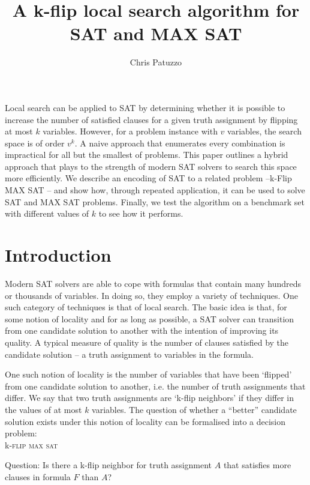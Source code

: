 \documentclass{article}
\begin{document}
\title{A k-flip local search algorithm for SAT and MAX SAT}
\author{Chris Patuzzo}
\maketitle

\abstract
Local search can be applied to SAT by determining whether it is possible to
increase the number of satisfied clauses for a given truth assignment by
flipping at most $k$ variables. However, for a problem instance with $v$
variables, the search space is of order $v^k$. A naive approach that enumerates
every combination is impractical for all but the smallest of problems. This
paper outlines a hybrid approach that plays to the strength of modern SAT
solvers to search this space more efficiently. We describe an encoding of SAT
to a related problem –\linebreak k-Flip MAX SAT – and show how, through repeated
application, it can be used to solve SAT and MAX SAT problems. Finally, we test
the algorithm on a benchmark set with different values of $k$ to see how it
performs.

\section{Introduction}

Modern SAT solvers are able to cope with formulas that contain many hundreds or
thousands of variables. In doing so, they employ a variety of techniques. One
such category of techniques is that of local search. The basic idea is that,
for some notion of locality and for as long as possible, a SAT solver can
transition from one candidate solution to another with the intention of
improving its quality. A typical measure of quality is the number of clauses
satisfied by the candidate solution – a truth assignment to variables in the
formula.

One such notion of locality is the number of variables that have been ‘flipped’
from one candidate solution to another, i.e. the number of truth assignments
that differ. We say that two truth assignments are ‘k-flip neighbors’ if they
differ in the values of at most $k$ variables\cite{10.1007/978-3-642-02777-2_27}.
The question of whether a “better” candidate solution exists under this notion
of locality can be formalised into a decision problem:\\

k-\textsc{flip max sat}

Question: Is there a k-flip neighbor for truth assignment $A$ that satisfies
more clauses in formula $F$ than $A$? \\
\end{document}

